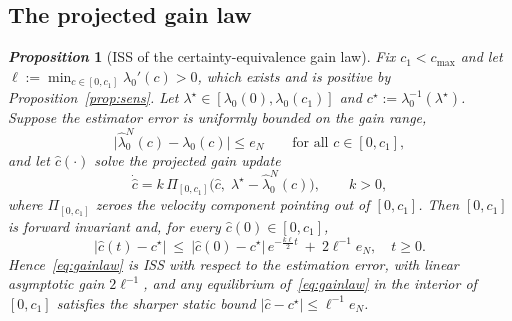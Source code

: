 \documentclass[letterpaper, 10pt, conference]{ieeeconf}
\newtheorem{proposition}{\it \textbf{Proposition}}
\newcommand{\rev}[1]{#1}
\begin{document}
\subsection{\rev{The projected gain law}}
\label{sec:gainlaw}
\begin{proposition}[\rev{ISS of the certainty-equivalence gain law}]
\label{prop:feedback}
Fix $c_1<c_{\max}$ and let $\ell:=\min_{c\in[0,c_1]}\lambda_0'(c)>0$, which exists and
is positive by Proposition~\ref{prop:sens}. Let
$\lambda^\star\in[\lambda_0(0),\lambda_0(c_1)]$ and
$c^\star:=\lambda_0^{-1}(\lambda^\star)$. Suppose the estimator error is
uniformly bounded on the gain range,
\begin{equation}
\rev{\bigl|\widehat\lambda_0^N(c)-\lambda_0(c)\bigr|\le e_N
\qquad\text{for all }c\in[0,c_1],}
\label{eq:esterr}
\end{equation}
and let $\widehat c(\cdot)$ solve the projected gain update
\begin{equation}
\dot{\widehat c}=k\,\Pi_{[0,c_1]}\!\bigl(\widehat c,\;\lambda^\star-\widehat\lambda_0^N(\widehat c)\bigr),
\qquad k>0,
\label{eq:gainlaw}
\end{equation}
\rev{where $\Pi_{[0,c_1]}$ zeroes the velocity component pointing out of
$[0,c_1]$. Then $[0,c_1]$ is forward invariant and, for every
$\widehat c(0)\in[0,c_1]$,}
\begin{equation}
\rev{|\widehat c(t)-c^\star|\ \le\ |\widehat c(0)-c^\star|\,e^{-\frac{k\ell}{2} t}
\ +\ 2\ell^{-1}e_N ,\quad t\ge0 .}
\label{eq:iss}
\end{equation}
\rev{Hence~\eqref{eq:gainlaw} is ISS with respect to the estimation error, with
linear asymptotic gain $2\ell^{-1}$, and any equilibrium of~\eqref{eq:gainlaw}
in the interior of $[0,c_1]$ satisfies the sharper static bound
$|\widehat c-c^\star|\le\ell^{-1}e_N$.}
\end{proposition}
\end{document}
